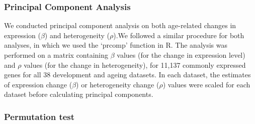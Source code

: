 \documentclass[12pt,twoside]{unicam}
\begin{document}
\hypertarget{principal-component-analysis}{%
\subsubsection{Principal Component Analysis}\label{principal-component-analysis}}

We conducted principal component analysis on both age-related changes in expression (\(\beta\)) and heterogeneity (\(\rho\)).We followed a similar procedure for both analyses, in which we used the `prcomp' function in R. The analysis was performed on a matrix containing \(\beta\) values (for the change in expression level) and \(\rho\) values (for the change in heterogeneity), for 11,137 commonly expressed genes for all 38 development and ageing datasets. In each dataset, the estimates of expression change (\(\beta\)) or heterogeneity change (\(\rho\)) values were scaled for each dataset before calculating principal components.

\hypertarget{permutation-test}{%
\subsubsection{Permutation test}\label{permutation-test}}
\end{document}
